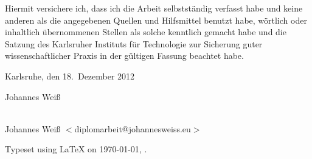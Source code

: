 \cleardoublepage{}

\thispagestyle{empty}

\vspace*{\fill}


\bigskip{}

\noindent{}Hiermit versichere ich, dass ich die Arbeit selbstst\"andig verfasst
habe und keine anderen als die angegebenen Quellen und Hilfsmittel benutzt habe,
w\"ortlich oder inhaltlich \"ubernommenen Stellen als solche kenntlich
gemacht habe und die Satzung des Karlsruher Instituts f\"ur Technologie zur
Sicherung guter wissenschaftlicher Praxis in der g\"ultigen Fassung beachtet
habe.

\bigskip{}

Karlsruhe, den 18.\ Dezember 2012

\bigskip{}

\bigskip{}

\bigskip{}

Johannes Wei\ss

\vspace*{\fill}

\cleardoublepage

\thispagestyle{empty}

\vspace*{\fill}
\begin{center}
{\Large \JWtitle{}} \\
Johannes Wei\ss{} $<$diplomarbeit@johannesweiss.eu$>$
\end{center}
\vspace*{\fill}

\newpage
\thispagestyle{empty}

\null
\vfill
\hfill Typeset using \LaTeX{} on \today{}, \currenttime{}.

